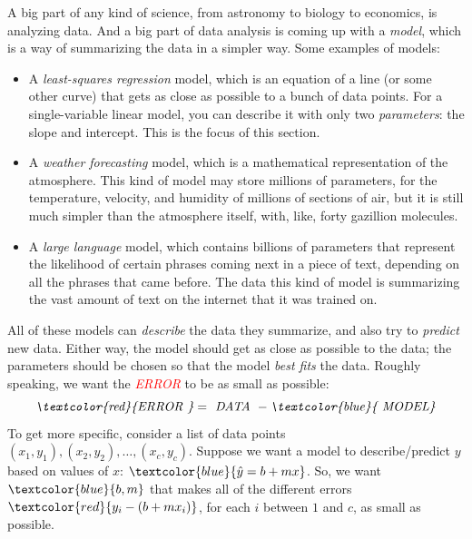 \documentclass[11pt, letterpaper]{report}
\newcounter{example}[section]
\begin{document}
A big part of any kind of science, from astronomy to biology to economics, is analyzing data. And a big part of data analysis is coming up with a \emph{model}, which is a way of summarizing the data in a simpler way. Some examples of models:
\begin{itemize}
\item A \emph{least-squares regression} model, which is an equation of a line (or some other curve) that gets as close as possible to a bunch of data points. For a single-variable linear model, you can describe it with only two \emph{parameters}: the slope and intercept. This is the focus of this section.
\item A \emph{weather forecasting} model, which is a mathematical representation of the atmosphere. This kind of model may store millions of parameters, for the temperature, velocity, and humidity of millions of sections of air, but it is still much simpler than the atmosphere itself, with, like, forty gazillion molecules.
\item A \emph{large language} model, which contains billions of parameters that represent the likelihood of certain phrases coming next in a piece of text, depending on all the phrases that came before. The data this kind of model is summarizing the vast amount of text on the internet that it was trained on.
\end{itemize}

All of these models can \emph{describe} the data they summarize, and also try to \emph{predict} new data. Either way, the model should get as close as possible to the data; the parameters should be chosen so that the model \emph{best fits} the data. Roughly speaking, we want the \emph{\textcolor{red}{ERROR}} to be as small as possible:
\[\textit{\textcolor{red}{ERROR }} = \textit{ DATA } - \textit{\textcolor{blue}{ MODEL}}\]
To get more specific, consider a list of data points $(x_1,y_1),(x_2,y_2),\ldots,(x_c,y_c)$. Suppose we want a model to describe/predict $y$ based on values of $x$: $\textcolor{blue}{\hat{y}=b+mx}$. So, we want $\textcolor{blue}{b,m}$ that makes all of the different errors $\textcolor{red}{y_{i}-(b+mx_{i})}$, for each $i$ between $1$ and $c$, as small as possible.
\end{document}
